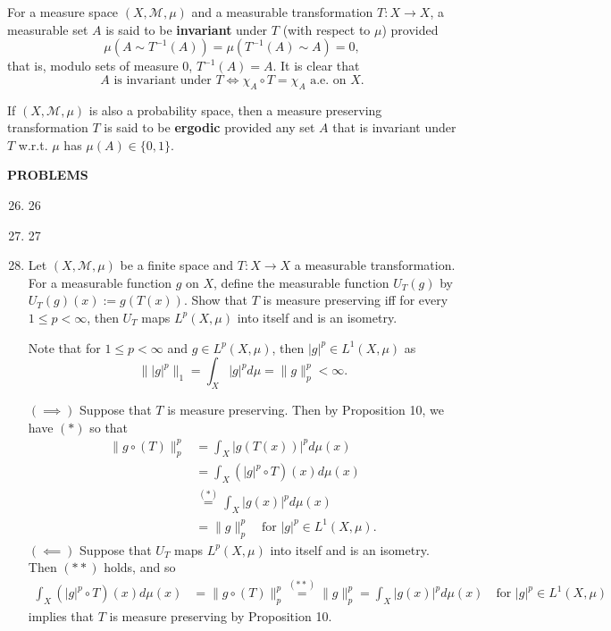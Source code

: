 For a measure space $(X,\mathcal{M},\mu)$ and a measurable transformation $T:X\to X$, a measurable set $A$ is said to be \textbf{invariant} under $T$ (with respect to $\mu$) provided
\[
    \mu(A\sim T^{-1}(A))=\mu(T^{-1}(A)\sim A)=0,
\]
that is, modulo sets of measure 0, $T^{-1}(A)=A$.
It is clear that 
\[
    A\text{ is invariant under }T\iff\chi_A\circ T=\chi_A \text{ a.e. on }X.
\]

If $(X,\mathcal{M},\mu)$ is also a probability space, then a measure preserving transformation $T$ is said to be \textbf{ergodic} provided any set $A$ that is invariant under $T$ w.r.t. $\mu$ has $\mu(A)\in\{0,1\}$.

\begin{center}
	\textbf{PROBLEMS}
\end{center}
\begin{enumerate}
	\setcounter{enumi}{25}
    \item 26
    \item 27
    \item Let $(X,\mathcal{M},\mu)$ be a finite space and $T:X\to X$ a measurable transformation.
    For a measurable function $g$ on $X$, define the measurable function $U_T(g)$ by $U_T(g)(x):=g(T(x))$.
    Show that $T$ is measure preserving iff for every $1\le p<\infty$, then $U_T$ maps $L^p(X,\mu)$ into itself and is an isometry.

    Note that for $1\le p<\infty$ and $g\in L^p(X,\mu)$, then $|g|^p\in L^1(X,\mu)$ as 
    \[
        \||g|^p\|_1=\int_X|g|^pd\mu=\|g\|_p^p<\infty.
    \]
    
    $(\implies)$ Suppose that $T$ is measure preserving.
    Then by Proposition 10, we have $(*)$ so that 
    \begin{align*}
        \|g\circ(T)\|_p^p
        &=\int_X|g(T(x))|^pd\mu(x)\\
        &=\int_X(|g|^p\circ T)(x)d\mu(x)\\
        &\overset{(*)}{=}\int_X|g(x)|^pd\mu(x)\\
        &=\|g\|_p^p
        \quad\text{for }|g|^p\in L^1(X,\mu).
    \end{align*}
    $(\impliedby)$ Suppose that $U_T$ maps $L^p(X,\mu)$ into itself and is an isometry.
    Then $(**)$ holds, and so 
    \begin{align*}
        \int_X(|g|^p\circ T)(x)d\mu(x)
        &=\|g\circ(T)\|_p^p
        \overset{(**)}{=}\|g\|_p^p=\int_X|g(x)|^pd\mu(x)
        \quad\text{for }|g|^p\in L^1(X,\mu)
    \end{align*}
    implies that $T$ is measure preserving by Proposition 10.
\end{enumerate}

